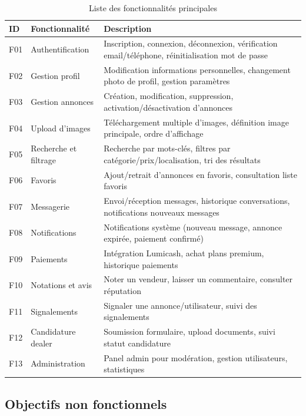 \documentclass[12pt,a4paper]{report}
\begin{document}
\begin{table}[H]
\centering
\begin{tabular}{|p{1cm}|p{5cm}|p{7cm}|}
\hline
\textbf{ID} & \textbf{Fonctionnalité} & \textbf{Description} \\
\hline
F01 & Authentification & Inscription, connexion, déconnexion, vérification email/téléphone, réinitialisation mot de passe \\
\hline
F02 & Gestion profil & Modification informations personnelles, changement photo de profil, gestion paramètres \\
\hline
F03 & Gestion annonces & Création, modification, suppression, activation/désactivation d'annonces \\
\hline
F04 & Upload d'images & Téléchargement multiple d'images, définition image principale, ordre d'affichage \\
\hline
F05 & Recherche et filtrage & Recherche par mots-clés, filtres par catégorie/prix/localisation, tri des résultats \\
\hline
F06 & Favoris & Ajout/retrait d'annonces en favoris, consultation liste favoris \\
\hline
F07 & Messagerie & Envoi/réception messages, historique conversations, notifications nouveaux messages \\
\hline
F08 & Notifications & Notifications système (nouveau message, annonce expirée, paiement confirmé) \\
\hline
F09 & Paiements & Intégration Lumicash, achat plans premium, historique paiements \\
\hline
F10 & Notations et avis & Noter un vendeur, laisser un commentaire, consulter réputation \\
\hline
F11 & Signalements & Signaler une annonce/utilisateur, suivi des signalements \\
\hline
F12 & Candidature dealer & Soumission formulaire, upload documents, suivi statut candidature \\
\hline
F13 & Administration & Panel admin pour modération, gestion utilisateurs, statistiques \\
\hline
\end{tabular}
\caption{Liste des fonctionnalités principales}
\end{table}

\subsection{Objectifs non fonctionnels}
\end{document}
